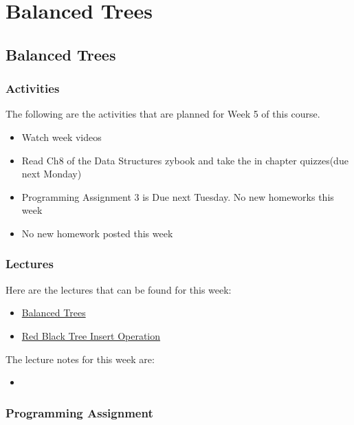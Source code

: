 \clearpage

\renewcommand{\ChapTitle}{Balanced Trees}

\chapter{\ChapTitle}
\section{\ChapTitle}

\subsection{Activities}

The following are the activities that are planned for Week 5 of this course.

\begin{itemize}
    \item Watch week videos
    \item Read Ch8 of the Data Structures zybook and take the in chapter quizzes(due next Monday)
    \item Programming Assignment 3 is Due next Tuesday. No new homeworks this week
    \item No new homework posted this week
\end{itemize}

\subsection{Lectures}

Here are the lectures that can be found for this week:

\begin{itemize}
    \item \href{https://applied.cs.colorado.edu/mod/hvp/view.php?id=45925}{Balanced Trees}
    \item \href{https://applied.cs.colorado.edu/mod/hvp/view.php?id=45926}{Red Black Tree Insert Operation}
\end{itemize}

\noindent The lecture notes for this week are:

\begin{itemize}
    \item {}
\end{itemize}

\subsection{Programming Assignment}

